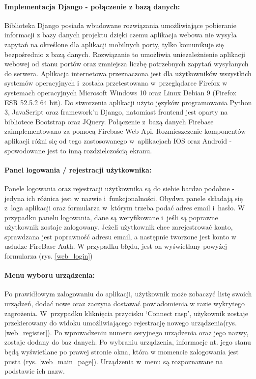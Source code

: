 \paragraph{Implementacja Django - połączenie z bazą danych:}
Biblioteka Django posiada wbudowane rozwiązania umożliwiające pobieranie informacji z bazy danych projektu dzięki czemu aplikacja webowa nie wysyła zapytań na określone dla aplikacji mobilnych porty, tylko komunikuje się bezpośrednio z bazą danych. Rozwiązanie to umożliwia uniezależnienie aplikacji webowej od stanu portów oraz zmniejsza liczbę potrzebnych zapytań wysyłanych do serwera.
Aplikacja internetowa przeznaczona jest dla użytkowników wszystkich systemów operacyjnych i~została przetestowana w~przeglądarce Firefox w systemach operacyjnych Microsoft Windows 10 oraz Linux Debian 9 (Firefox ESR 52.5.2 64 bit). Do stworzenia aplikacji użyto języków programowania Python 3, JavaScript oraz framework'u Django, natomiast frontend jest oparty na bibliotece Bootstrap oraz JQuery. Połączenie z~bazą danych Firebase zaimplementowano za pomocą Firebase Web Api. Rozmieszczenie komponentów aplikacji różni się od tego zastosowanego w~aplikacjach IOS oraz Android - spowodowane jest to inną rozdzielczością ekranu. 

\paragraph{Panel logowania / rejestracji użytkownika:} Panele logowania oraz rejestracji użytkownika są do siebie bardzo podobne - jedyna ich różnica jest w nazwie i~funkcjonalności. Obydwa panele składają się z~loga aplikacji oraz formularza w~którym trzeba podać adres email i~hasło. W przypadku panelu logowania, dane są weryfikowane i~jeśli są poprawne użytkownik zostaje zalogowany. Jeżeli użytkownik chce zarejestrować konto, sprawdzana jest poprawność adresu email, a następnie tworzone jest konto w usłudze FireBase Auth. W przypadku błędu, jest on wyświetlany powyżej formularza (rys. \ref{web_login})

\paragraph{Menu wyboru urządzenia:} Po prawidłowym zalogowaniu do aplikacji, użytkownik może zobaczyć listę swoich urządzeń, dodać nowe oraz zaczyna dostawać powiadomienia w razie wykrytego zagrożenia. W~przypadku kliknięcia przycisku `Connect rasp', użykownik zostaje przekierowany do widoku umożliwiającego rejestrację nowego urządzenia(rys. \ref{web_register}). Po wprowadzeniu numeru seryjnego urządzenia oraz jego nazwy, zostaje dodany do baz danych. Po wybraniu urządzenia, informacje nt. jego stanu będą wyświetlane po prawej stronie okna, która w momencie zalogowania jest pusta (rys. \ref{web_main_page}). Urządzenia w~menu są rozpoznawane na podstawie ich nazw. 

